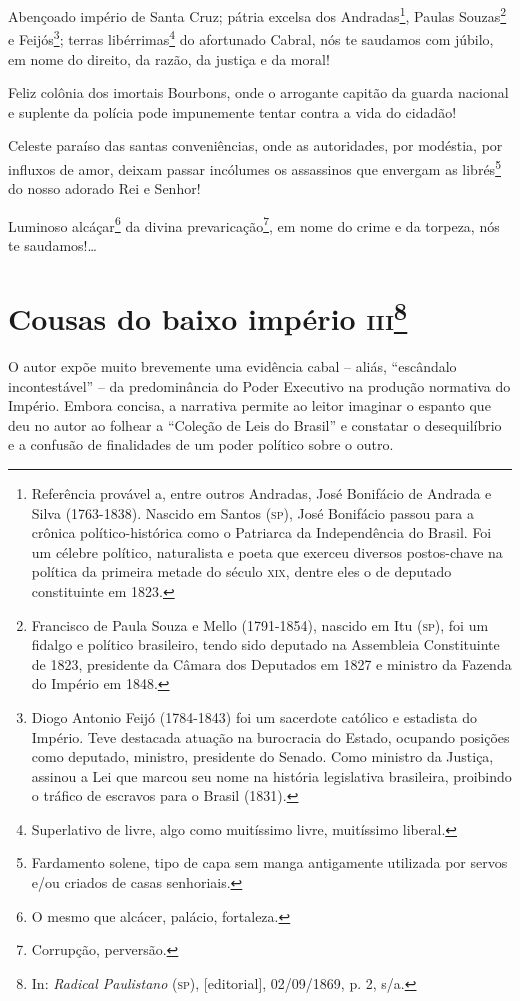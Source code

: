 Abençoado império de Santa Cruz; pátria excelsa dos Andradas\footnote{
  Referência provável a, entre outros Andradas, José Bonifácio de
  Andrada e Silva (1763-1838). Nascido em Santos (\textsc{sp}), José Bonifácio
  passou para a crônica político-histórica como o Patriarca da
  Independência do Brasil. Foi um célebre político, naturalista e poeta
  que exerceu diversos postos-chave na política da primeira metade do
  século \textsc{xix}, dentre eles o de deputado constituinte em 1823.}, Paulas
Souzas\footnote{Francisco de Paula Souza e Mello (1791-1854), nascido
  em Itu (\textsc{sp}), foi um fidalgo e político brasileiro, tendo sido deputado
  na Assembleia Constituinte de 1823, presidente da Câmara dos Deputados
  em 1827 e ministro da Fazenda do Império em 1848.} e
Feijós\footnote{Diogo Antonio Feijó (1784-1843) foi um sacerdote
  católico e estadista do Império. Teve destacada atuação na burocracia
  do Estado, ocupando posições como deputado, ministro, presidente do
  Senado. Como ministro da Justiça, assinou a Lei que marcou seu nome na
  história legislativa brasileira, proibindo o tráfico de escravos para
  o Brasil (1831).}; terras libérrimas\footnote{Superlativo de livre,
  algo como muitíssimo livre, muitíssimo liberal.} do afortunado Cabral,
nós te saudamos com júbilo, em nome do direito, da razão, da justiça e
da moral!

Feliz colônia dos imortais Bourbons, onde o arrogante capitão da guarda
nacional e suplente da polícia pode impunemente tentar contra a vida do
cidadão!

Celeste paraíso das santas conveniências, onde as autoridades, por
modéstia, por influxos de amor, deixam passar incólumes os assassinos
que envergam as librés\footnote{Fardamento solene, tipo de capa sem
  manga antigamente utilizada por servos e/ou criados de casas
  senhoriais.} do nosso adorado Rei e Senhor!

Luminoso alcáçar\footnote{O mesmo que alcácer, palácio, fortaleza.} da
divina prevaricação\footnote{Corrupção, perversão.}, em nome do crime
e da torpeza, nós te saudamos!\ldots{}

\chapter{Cousas do baixo império \textsc{iii}\footnote{In: \emph{Radical
  Paulistano} (\textsc{sp}), {[}editorial{]}, 02/09/1869, p. 2, s/a.}}

\begin{didascalia}
O autor expõe muito brevemente uma evidência cabal -- aliás, ``escândalo
incontestável'' -- da predominância do Poder Executivo na produção
normativa do Império. Embora concisa, a narrativa permite ao leitor
imaginar o espanto que deu no autor ao folhear a ``Coleção de Leis do
Brasil'' e constatar o desequilíbrio e a confusão de finalidades de um
poder político sobre o outro.
\end{didascalia}



